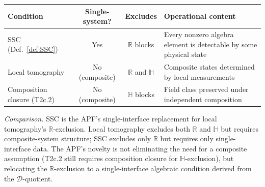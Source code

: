 \documentclass[11pt,a4paper]{article}
\theoremstyle{definition}
\begin{document}
\begin{center}\small
\renewcommand{\arraystretch}{1.15}
\begin{tabular}{@{}p{3.2cm}ccp{4.8cm}@{}}
\toprule
\textbf{Condition} & \textbf{Single-system?} & \textbf{Excludes} & \textbf{Operational content} \\
\midrule
SSC (Def.~\ref{def:SSC}) & Yes & $\mathbb{R}$ blocks & Every nonzero algebra element is detectable by some physical state \\
Local tomography & No (composite) & $\mathbb{R}$ and $\mathbb{H}$ & Composite states determined by local measurements \\
Composition closure (T2c.2) & No (composite) & $\mathbb{H}$ blocks & Field class preserved under independent composition \\
\bottomrule
\end{tabular}
\end{center}
\smallskip\noindent\textit{Comparison.}  SSC is the APF's single-interface replacement for local tomography's $\mathbb{R}$-exclusion.  Local tomography excludes both $\mathbb{R}$ and $\mathbb{H}$ but requires composite-system structure; SSC excludes only $\mathbb{R}$ but requires only single-interface data.  The APF's novelty is not eliminating the need for a composite assumption (T2c.2 still requires composition closure for $\mathbb{H}$-exclusion), but relocating the $\mathbb{R}$-exclusion to a single-interface algebraic condition derived from the $\mathcal{D}$-quotient.
\end{document}
